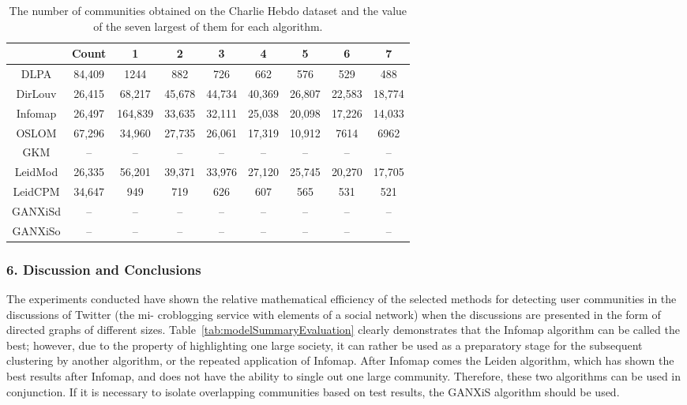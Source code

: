 \begin{table}[ht]%
	\centering
	\caption{The number of communities obtained on the Charlie Hebdo dataset and the value of the seven largest of them for each algorithm.}%
	\label{tab:charlieHebdoCommunityNumber}%
		\begin{tabular}{ c  c  c  c  c  c  c  c  c }%
			\toprule
			& Count & 1 & 2 & 3 & 4 & 5 & 6 & 7\\
			\hline
			DLPA & 84,409 & 1244 & 882 & 726 & 662 & 576 & 529 & 488  \\
			DirLouv & 26,415 & 68,217 & 45,678 & 44,734 & 40,369 & 26,807 & 22,583 & 18,774 \\
			Infomap & 26,497 & 164,839 & 33,635 & 32,111 & 25,038 & 20,098 & 17,226 & 14,033 \\
			OSLOM & 67,296 & 34,960 & 27,735 & 26,061 & 17,319 & 10,912 & 7614 & 6962 \\
			GKM & -- & -- & -- & -- & -- & -- & -- & -- \\
			LeidMod & 26,335 & 56,201 & 39,371 & 33,976 & 27,120 & 25,745 & 20,270 & 17,705 \\
			LeidCPM & 34,647 & 949 & 719 & 626 & 607 & 565 & 531 & 521 \\
			GANXiSd & -- & -- & -- & -- & -- & -- & -- & -- \\
			GANXiSo & -- & -- & -- & -- & -- & -- & -- & -- \\
			\bottomrule
		\end{tabular}%
\end{table}

\subsubsection{6. Discussion and Conclusions}

The experiments conducted have shown the relative mathematical efficiency of the selected methods for detecting user communities in the discussions of Twitter (the mi- croblogging service with elements of a social network) when the discussions are presented in the form of directed graphs of different sizes. Table~\cref{tab:modelSummaryEvaluation} clearly demonstrates that the Infomap algorithm can be called the best; however, due to the property of highlighting one large society, it can rather be used as a preparatory stage for the subsequent clustering by another algorithm, or the repeated application of Infomap. After Infomap comes the Leiden algorithm, which has shown the best results after Infomap, and does not have the ability to single out one large community. Therefore, these two algorithms can be used in conjunction. If it is necessary to isolate overlapping communities based on test results, the GANXiS algorithm should be used.

